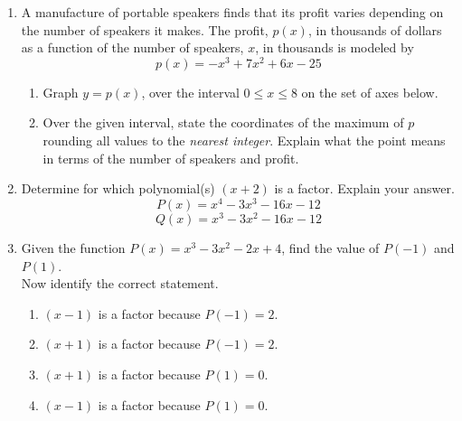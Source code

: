 \documentclass[12pt, twoside]{article}
\begin{document}
\begin{enumerate}[itemsep=0.5cm]
\newpage
\item A manufacture of portable speakers finds that its profit varies depending on the number of speakers it makes. The profit, $p(x)$, in thousands of dollars as a function of the number of speakers, $x$, in thousands is modeled by $$p(x) = -x^3+7x^2+6x-25$$
\begin{enumerate}
    \item Graph $y=p(x)$, over the interval $0 \leq x \leq 8$ on the set of axes below.
    \item Over the given interval, state the coordinates of the maximum of $p$ rounding all values to the \emph{nearest integer}. Explain what the point means in terms of the number of speakers and profit. \vspace{3cm}
\end{enumerate}
\begin{center}
    \end{center}

\newpage
\item Determine for which polynomial(s) $(x + 2)$ is a factor. Explain your answer.
 $$P(x) = x^4-3x^3-16x-12$$ 
 $$Q(x) = x^3-3x^2-16x-12$$ \vspace{10cm}

\item Given the function $P(x) = x^3-3x^2-2x+4$, find the value of $P(-1)$ and $P(1)$.\\[5cm]
Now identify the correct statement.
\begin{enumerate}
    \item $(x-1)$ is a factor because $P(-1)=2$.
    \item $(x+1)$ is a factor because $P(-1)=2$.
    \item $(x+1)$ is a factor because $P(1)=0$.
    \item $(x-1)$ is a factor because $P(1)=0$.
\end{enumerate}


\end{enumerate}
\end{document}
